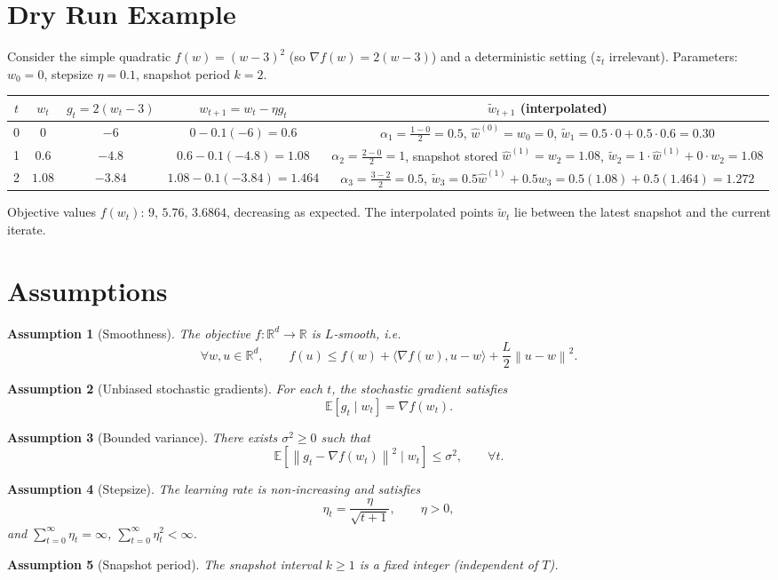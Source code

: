 \documentclass{article}
\newtheorem{assumption}{Assumption}
\newcommand{\E}{\mathbb{E}}
\newcommand{\R}{\mathbb{R}}
\newcommand{\norm}[1]{\left\lVert #1\right\rVert}
\begin{document}
\section*{Dry Run Example}
Consider the simple quadratic $f(w)=(w-3)^2$ (so $\nabla f(w)=2(w-3)$) and a deterministic setting ($z_t$ irrelevant).  
Parameters: $w_0=0$, stepsize $\eta=0.1$, snapshot period $k=2$.

\begin{center}
\begin{tabular}{c|c|c|c|c}
$t$ & $w_t$ & $g_t=2(w_t-3)$ & $w_{t+1}=w_t-\eta g_t$ & $\tilde w_{t+1}$ (interpolated)\\ \hline
0 & $0$ & $-6$ & $0-0.1(-6)=0.6$ & $\alpha_1=\frac{1-0}{2}=0.5$, $\widehat w^{(0)}=w_0=0$, $\tilde w_1=0.5\cdot0+0.5\cdot0.6=0.30$ \\
1 & $0.6$ & $-4.8$ & $0.6-0.1(-4.8)=1.08$ & $\alpha_2=\frac{2-0}{2}=1$, snapshot stored $\widehat w^{(1)}=w_2=1.08$, $\tilde w_2=1\cdot\widehat w^{(1)}+0\cdot w_2=1.08$ \\
2 & $1.08$ & $-3.84$ & $1.08-0.1(-3.84)=1.464$ & $\alpha_3=\frac{3-2}{2}=0.5$, $\tilde w_3=0.5\widehat w^{(1)}+0.5 w_3=0.5(1.08)+0.5(1.464)=1.272$
\end{tabular}
\end{center}
Objective values $f(w_t)$: $9$, $5.76$, $3.6864$, decreasing as expected. The interpolated points $\tilde w_t$ lie between the latest snapshot and the current iterate.

\newpage
\section*{Assumptions}
\begin{assumption}[Smoothness]\label{ass:smooth}
The objective $f:\R^d\to\R$ is $L$‑smooth, i.e.
\[
\forall w,u\in\R^d,\qquad
f(u)\le f(w)+\langle\nabla f(w),u-w\rangle+\frac{L}{2}\norm{u-w}^2 .
\]
\end{assumption}
\begin{assumption}[Unbiased stochastic gradients]\label{ass:unbiased}
For each $t$, the stochastic gradient satisfies
\[
\E\!\left[g_t\mid w_t\right]=\nabla f(w_t).
\]
\end{assumption}
\begin{assumption}[Bounded variance]\label{ass:variance}
There exists $\sigma^2\ge0$ such that
\[
\E\!\left[\norm{g_t-\nabla f(w_t)}^2\mid w_t\right]\le\sigma^2,\qquad\forall t .
\]
\end{assumption}
\begin{assumption}[Stepsize]\label{ass:stepsize}
The learning rate is non‑increasing and satisfies
\[
\eta_t=\frac{\eta}{\sqrt{t+1}},\qquad \eta>0,
\]
and $\displaystyle \sum_{t=0}^{\infty}\eta_t=\infty$, $\displaystyle \sum_{t=0}^{\infty}\eta_t^2<\infty$.
\end{assumption}
\begin{assumption}[Snapshot period]\label{ass:snapshot}
The snapshot interval $k\ge1$ is a fixed integer (independent of $T$). 
\end{assumption}
\end{document}
